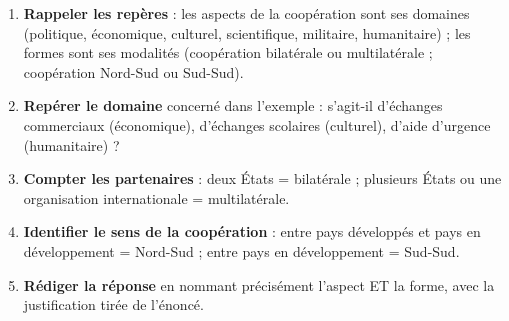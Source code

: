 \documentclass[11pt]{article}
\newcommand{\cle}[1]{{\popxbold\color{popdark}#1}}
\begin{document}
\begin{methode}
\begin{enumerate}
\item \textbf{Rappeler les repères} : les \cle{aspects} de la coopération sont ses domaines (politique, économique, culturel, scientifique, militaire, humanitaire) ; les \cle{formes} sont ses modalités (coopération bilatérale ou multilatérale ; coopération Nord-Sud ou Sud-Sud).
\item \textbf{Repérer le domaine} concerné dans l'exemple : s'agit-il d'échanges commerciaux (économique), d'échanges scolaires (culturel), d'aide d'urgence (humanitaire) ?
\item \textbf{Compter les partenaires} : deux États = bilatérale ; plusieurs États ou une organisation internationale = multilatérale.
\item \textbf{Identifier le sens de la coopération} : entre pays développés et pays en développement = Nord-Sud ; entre pays en développement = Sud-Sud.
\item \textbf{Rédiger la réponse} en nommant précisément l'aspect ET la forme, avec la justification tirée de l'énoncé.
\end{enumerate}
\end{methode}
\end{document}

